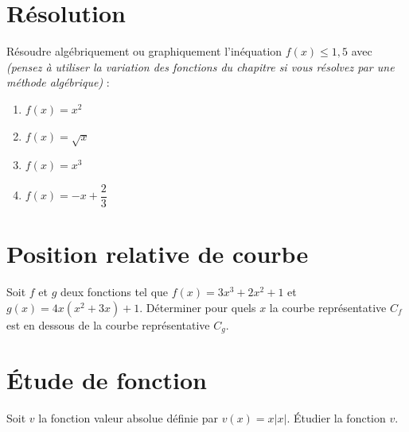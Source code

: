 \documentclass[9pt,french]{article}
\begin{document}
\newpage

\section{Résolution}

Résoudre algébriquement ou graphiquement l'inéquation $f(x) \leq 1,5$ avec \textit{(pensez à utiliser la variation des fonctions du chapitre si vous résolvez par une méthode algébrique)} : \\
\begin{enumerate}
\item $f(x)=x^2 $
\item $f(x)=\sqrt{x}$
\item $f(x)=x^3$
\item $f(x)=-x+ \dfrac{2}{3} $
\end{enumerate}



\section{Position relative de courbe}
Soit $f$ et $g$ deux fonctions tel que $f(x)=3x^3+2x^2+1$ et $g(x)=4x(x^2+3x)+1$. 
Déterminer pour quels $x$ la courbe représentative $C_f$ est en dessous de la courbe représentative $C_g$.

\section{Étude de fonction}
Soit $v$ la fonction valeur absolue définie par $v(x)=x\vert x \vert$. Étudier la fonction $v$.


\newpage 

\end{document}
